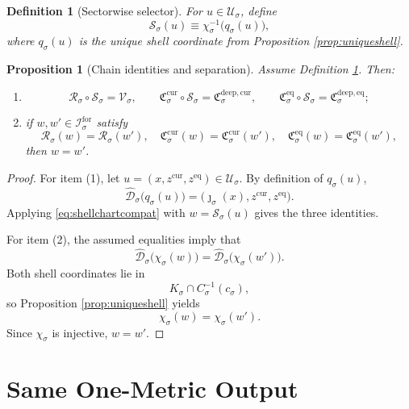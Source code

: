 \documentclass[11pt]{article}
\newcommand{\ForSpace}[1]{\mathcal I_{#1}^{\mathrm{for}}}
\newcommand{\Reduction}[1]{\mathcal R_{#1}}
\newcommand{\CurrentCarrier}[1]{\mathfrak C_{#1}^{\mathrm{cur}}}
\newcommand{\EqCarrier}[1]{\mathfrak C_{#1}^{\mathrm{eq}}}
\newcommand{\DeepSpace}[1]{\mathcal U_{#1}}
\newcommand{\VisibleMap}[1]{\mathcal V_{#1}}
\newcommand{\DeepCurrentCarrier}[1]{\mathfrak C_{#1}^{\mathrm{deep,cur}}}
\newcommand{\DeepEqCarrier}[1]{\mathfrak C_{#1}^{\mathrm{deep,eq}}}
\newcommand{\ChainSelect}[1]{\mathcal S_{#1}}
\newcommand{\CoordBody}[1]{K_{#1}}
\newcommand{\AffineData}[1]{\widehat{\mathcal D}_{#1}}
\newcommand{\ConstraintMap}[1]{C_{#1}}
\newcommand{\ConstraintValue}[1]{c_{#1}}
\newcommand{\ShellChart}[1]{\chi_{#1}}
\newtheorem{definition}{Definition}
\newtheorem{proposition}{Proposition}
\begin{document}
\begin{definition}[Sectorwise selector]
\label{def:selector}
For \(u\in\DeepSpace{\sigma}\), define
\begin{equation}
\ChainSelect{\sigma}(u)
\equiv
\ShellChart{\sigma}^{-1}\bigl(q_{\sigma}(u)\bigr),
\label{eq:selector}
\end{equation}
where \(q_{\sigma}(u)\) is the unique shell coordinate from Proposition \ref{prop:uniqueshell}.
\end{definition}

\begin{proposition}[Chain identities and separation]
\label{prop:separation}
Assume Definition \ref{def:selector}. Then:
\begin{enumerate}
    \item
    \[
    \Reduction{\sigma}\circ\ChainSelect{\sigma}
    =
    \VisibleMap{\sigma},
    \qquad
    \CurrentCarrier{\sigma}\circ\ChainSelect{\sigma}
    =
    \DeepCurrentCarrier{\sigma},
    \qquad
    \EqCarrier{\sigma}\circ\ChainSelect{\sigma}
    =
    \DeepEqCarrier{\sigma};
    \]
    \item if \(w,w'\in\ForSpace{\sigma}\) satisfy
    \[
    \Reduction{\sigma}(w)=\Reduction{\sigma}(w'),
    \quad
    \CurrentCarrier{\sigma}(w)=\CurrentCarrier{\sigma}(w'),
    \quad
    \EqCarrier{\sigma}(w)=\EqCarrier{\sigma}(w'),
    \]
    then \(w=w'\).
\end{enumerate}
\end{proposition}

\begin{proof}
For item (1), let \(u=(x,z^{\mathrm{cur}},z^{\mathrm{eq}})\in\DeepSpace{\sigma}\). By definition of \(q_{\sigma}(u)\),
\[
\AffineData{\sigma}\bigl(q_{\sigma}(u)\bigr)
=
\bigl(
\jmath_{\sigma}(x),z^{\mathrm{cur}},z^{\mathrm{eq}}
\bigr).
\]
Applying \eqref{eq:shellchartcompat} with \(w=\ChainSelect{\sigma}(u)\) gives the three identities.

For item (2), the assumed equalities imply that
\[
\AffineData{\sigma}\bigl(\ShellChart{\sigma}(w)\bigr)
=
\AffineData{\sigma}\bigl(\ShellChart{\sigma}(w')\bigr).
\]
Both shell coordinates lie in
\[
\CoordBody{\sigma}\cap\ConstraintMap{\sigma}^{-1}(\ConstraintValue{\sigma}),
\]
so Proposition \ref{prop:uniqueshell} yields
\[
\ShellChart{\sigma}(w)=\ShellChart{\sigma}(w').
\]
Since \(\ShellChart{\sigma}\) is injective, \(w=w'\).
\end{proof}

\section{Same One-Metric Output}
\end{document}
